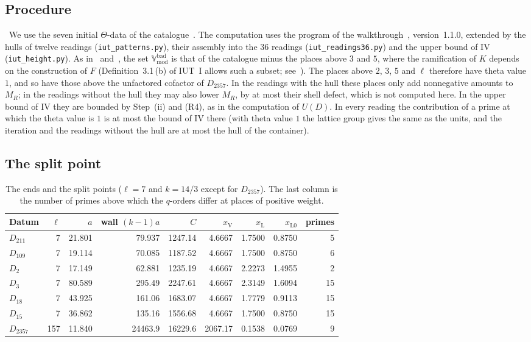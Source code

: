\documentclass[11pt,a4paper]{article}
\newcommand{\Vbad}{\mathbb{V}_{\mathrm{mod}}^{\mathrm{bad}}}
\newcommand{\rV}{\mathrm{V}}
\newcommand{\rL}{\mathrm{L}}
\newcommand{\rLz}{\mathrm{L0}}
\newcommand{\lab}[2]{{\upshape\fcolorbox{#1}{#1!8}{\scriptsize\sffamily\bfseries\textcolor{#1}{#2}}}}
\newcommand{\tagP}{\lab{ForestGreen}{P}}
\theoremstyle{plain}
\theoremstyle{definition}
\theoremstyle{remark}
\begin{document}
\subsection{Procedure}\label{ss:proc}
\tagP\ We use the seven initial $\Theta$-data of the catalogue~\cite{Cat}. The computation uses the program of the
walkthrough~\cite{WT}, version~1.1.0, extended by the hulls of twelve readings (\texttt{iut\_patterns.py}), their
assembly into the 36 readings (\texttt{iut\_readings36.py}) and the upper bound of IV (\texttt{iut\_height.py}). As
in~\cite{Gap} and~\cite{WT}, the set $\Vbad$ is that of the catalogue minus the places above $3$ and $5$, where the
ramification of $K$ depends on the construction of $F$ (Definition~3.1\,(b) of IUT~I allows such a subset; see~\cite[\S5]{Gap}). The places above
$2$, $3$, $5$ and $\ell$ therefore have theta value $1$, and so have those above the unfactored cofactor of $D_{2357}$.
In the readings with the hull these places only add nonnegative amounts to $M_R$; in the readings without the hull they
may also lower $M_R$, by at most their shell defect, which is not computed here. In the upper bound of IV they are
bounded by Step~(ii) and (R4), as in the computation of $U(D)$. In every reading the contribution of a prime at which the theta value is $1$ is at most the bound of IV there (with theta
value $1$ the lattice group gives the same as the units, and the iteration and the readings without the hull are at
most the hull of the container).

\subsection{The split point}\label{ss:x}
\begin{table}[ht]\centering\small
\caption{The ends and the split points ($\ell=7$ and $k=14/3$ except for $D_{2357}$). The last column is the number of
primes above which the $q$-orders differ at places of positive weight.}\label{tab:x}
\begin{tabular}{@{}lrrrrrrrr@{}}
\toprule
Datum & $\ell$ & $a$ & wall $(k-1)a$ & $C$ & $x_\rV$ & $x_\rL$ & $x_\rLz$ & primes\\
\midrule
$D_{211}$ & 7 & 21.801 & 79.937 & 1247.14 & 4.6667 & 1.7500 & 0.8750 & 5\\
$D_{109}$ & 7 & 19.114 & 70.085 & 1187.52 & 4.6667 & 1.7500 & 0.8750 & 6\\
$D_{2}$ & 7 & 17.149 & 62.881 & 1235.19 & 4.6667 & 2.2273 & 1.4955 & 2\\
$D_{3}$ & 7 & 80.589 & 295.49 & 2247.61 & 4.6667 & 2.3149 & 1.6094 & 15\\
$D_{18}$ & 7 & 43.925 & 161.06 & 1683.07 & 4.6667 & 1.7779 & 0.9113 & 15\\
$D_{15}$ & 7 & 36.862 & 135.16 & 1556.68 & 4.6667 & 1.7500 & 0.8750 & 15\\
$D_{2357}$ & 157 & 11.840 & 24463.9 & 16229.6 & 2067.17 & 0.1538 & 0.0769 & 9\\
\bottomrule
\end{tabular}
\end{table}
\end{document}
